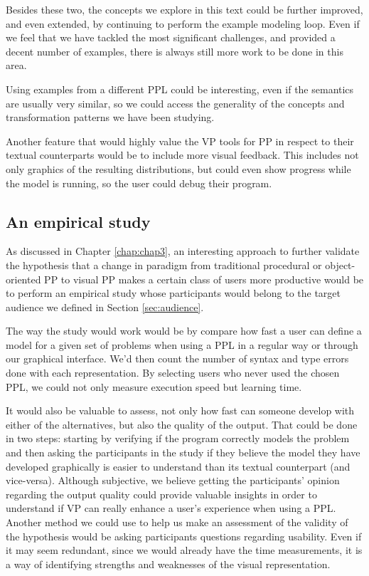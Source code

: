 Besides these two, the concepts we explore in this text could be further improved,
and even extended, by continuing to perform the example modeling loop.
Even if we feel that we have tackled the most significant
challenges, and provided a decent number of examples, there is always still more
work to be done in this area.

Using examples from a different PPL could be interesting, even if the semantics
are usually very similar, so we could access the generality of the concepts
and transformation patterns we have been studying.

Another feature that would highly value the VP tools for PP in respect to their
textual counterparts would be to include more visual feedback. This includes
not only graphics of the resulting distributions, but could even show progress
while the model is running, so the user could debug their program.

\subsection{An empirical study}

As discussed in Chapter \ref{chap:chap3}, an interesting approach to further validate
the hypothesis that a change in paradigm from traditional procedural or
object-oriented PP to visual PP makes a certain class of users more productive
would be to perform an empirical study whose participants would belong to the
target audience we defined in Section \ref{sec:audience}.

The way the study would work would be by compare how fast a user can define a model for a given set of problems
when using a PPL in a regular way or through our graphical interface. We'd then
count the number of syntax and type errors done with each representation. By
selecting users who never used the chosen PPL, we could not only measure execution
speed but learning time.

It would also be valuable to assess, not only how fast can someone develop with either
of the alternatives, but also the quality of the output. That could be done in two
steps: starting by verifying if the program correctly models the problem and then
asking the participants in the study if they believe the model they
have developed graphically is easier to understand than its textual counterpart (and
vice-versa).
Although subjective, we believe getting the participants' opinion
regarding the output quality could provide valuable insights in order to understand if VP can
really enhance a user's experience when using a PPL. Another method we could use
to help us make an assessment of the validity of the hypothesis would be asking
participants questions regarding usability. Even if it may seem redundant, since
we would already have the time measurements, it is a way of identifying strengths and
weaknesses of the visual representation.

